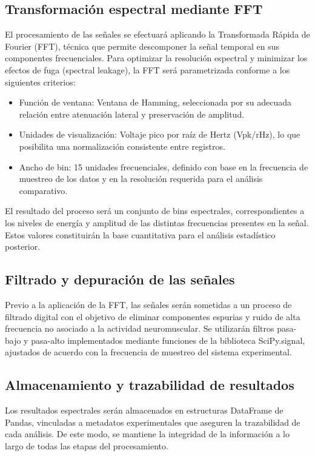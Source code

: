 \subsection{Transformación espectral mediante FFT}

El procesamiento de las señales se efectuará aplicando la Transformada Rápida de Fourier (FFT), técnica que permite descomponer la señal temporal en sus componentes frecuenciales.
Para optimizar la resolución espectral y minimizar los efectos de fuga (spectral leakage), la FFT será parametrizada conforme a los siguientes criterios:

\begin{itemize}
	\item Función de ventana: Ventana de Hamming, seleccionada por su adecuada relación entre atenuación lateral y preservación de amplitud.
	\item Unidades de visualización: Voltaje pico por raíz de Hertz (Vpk/rHz), lo que posibilita una normalización consistente entre registros.
	\item Ancho de bin: 15 unidades frecuenciales, definido con base en la frecuencia de muestreo de los datos y en la resolución requerida para el análisis comparativo.
\end{itemize}

El resultado del proceso será un conjunto de bins espectrales, correspondientes a los niveles de energía y amplitud de las distintas frecuencias presentes en la señal. Estos valores constituirán la base cuantitativa para el análisis estadístico posterior.

\subsection{Filtrado y depuración de las señales}

Previo a la aplicación de la FFT, las señales serán sometidas a un proceso de filtrado digital con el objetivo de eliminar componentes espurias y ruido de alta frecuencia no asociado a la actividad neuromuscular. Se utilizarán filtros pasa-bajo y pasa-alto implementados mediante funciones de la biblioteca SciPy.signal, ajustados de acuerdo con la frecuencia de muestreo del sistema experimental.

\subsection{Almacenamiento y trazabilidad de resultados}
Los resultados espectrales serán almacenados en estructuras DataFrame de Pandas, vinculadas a metadatos experimentales que aseguren la trazabilidad de cada análisis. De este modo, se mantiene la integridad de la información a lo largo de todas las etapas del procesamiento.

